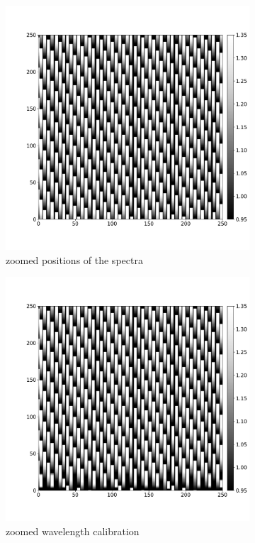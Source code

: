 \documentclass[twoside,single]{lion-msc}
\begin{document}
\begin{figure}[hb]
\centering
\begin{subfigure}{.5\textwidth}
  \centering
  \includegraphics[width=1\linewidth]{specpos}
  \caption{zoomed positions of the spectra}
  \label{fig:specpos}
\end{subfigure}%
\begin{subfigure}{.5\textwidth}
  \centering
  \includegraphics[width=1\linewidth]{wavecalib}
  \caption{zoomed wavelength calibration}
  \label{fig:wavecal}
\end{subfigure}
\caption{}
\end{figure}
\end{document}
